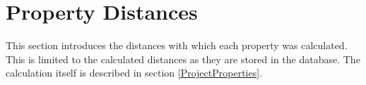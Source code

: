 \chapter{Property Distances}
\label{app:propdist}

This section introduces the distances with which each property was calculated. This is limited to the calculated distances as they are stored in the database. The calculation itself is described in section \ref{ProjectProperties}.

